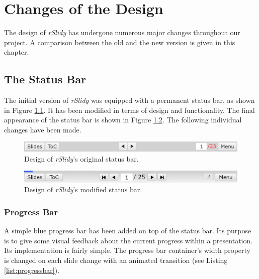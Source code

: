 %
%
% 
% 
% 


\chapter{Changes of the Design}

\label{chap:design}

The design of \textit{rSlidy} has undergone numerous major changes throughout our project. A comparison between the old and the new version is given in this chapter.

\section{The Status Bar}
The initial version of \textit{rSlidy} was equipped with a permanent status bar, as shown in Figure \ref{fig:statusbarOLD}. It has been modified in terms of design and functionality. The final appearance of the status bar is shown in  Figure \ref{fig:statusbarNEW}. The following individual changes have been made.

\begin{figure}[tp]
	\centering
	\includegraphics[width = \textwidth]{images/status_bar_old.png}
	
	\caption[Original Status Bar]{
		Design of \textit{rSlidy}'s original status bar.
	}
	\label{fig:statusbarOLD}
\end{figure}

\begin{figure}[tp]
	\centering
	\includegraphics[width = \textwidth]{images/status_bar_new.png}
	
	\caption[Modified Status Bar]{
		Design of \textit{rSlidy}'s modified status bar.
	}
	\label{fig:statusbarNEW}
\end{figure}


\subsection{Progress Bar}
A simple blue progress bar has been added on top of the status bar. Its purpose is to give some visual feedback about the current progress within a presentation. Its implementation is fairly simple. The progress bar container's width property is changed on each slide change with an animated transition (see Listing \ref{list:progressbar}).


